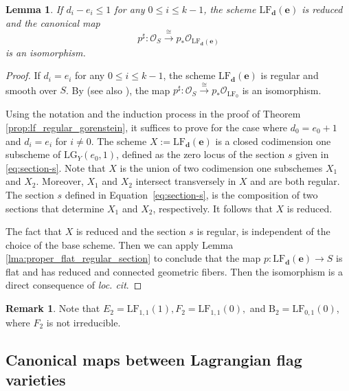 \documentclass[a4paper]{amsart}
\theoremstyle{plain}
\newtheorem{lemma}[theorem]{Lemma}
\theoremstyle{definition}
\newtheorem{remark}[theorem]{Remark}
\numberwithin{equation}{section}
\newcommand{\LG}{\mathrm{LG}}
\newcommand{\Bl}{\mathrm{B}}
\newcommand{\SO}{\mathcal{O}}
\newcommand{\LF}{\mathrm{LF}}
\begin{document}
\begin{lemma}\label{lma:lf_de_structure_sheaf}
    If $d_i -e_{i} \leq 1$ for any $ 0 \leq i \leq k-1$, the scheme $\mathrm{LF}_{\mathbf{d}}(\mathbf{e})$ is reduced and the canonical map
    \[
        p^{\sharp}:\SO_S \xrightarrow{\cong} p_* \SO_{\mathrm{LF}_{\mathbf{d}}(\mathbf{e})}
    \]
    is an isomorphism.
\end{lemma}
\begin{proof}
    If $d_i = e_{i}$ for any $ 0 \leq i \leq k-1$, the scheme $\mathrm{LF}_{\mathbf{d}}(\mathbf{e})$ is regular and smooth over $S$. By \cite[\href{https://stacks.math.columbia.edu/tag/0E0L}{Lemma 0E0L}]{stacks-project} (see also \cite[Exercise 9.3.11, p.260]{FAG}), the map $p^{\sharp}:\SO_S \xrightarrow{\cong} p_* \SO_{\mathrm{LF}_0}$ is an isomorphism.

    Using the notation and the induction process in the proof of Theorem \ref{prop:lf_regular_gorenstein}, it suffices to prove for the case where $d_0 = e_0 + 1$ and $d_i = e_i$ for $i\neq 0$. The scheme $X := \mathrm{LF}_{\mathbf{d}}(\mathbf{e})$ is a closed codimension one subscheme of $\LG_Y(e_0,1)$, defined as the zero locus of the section $s$ given in \eqref{eq:section-s}. Note that $X$ is the union of two codimension one subschemes $X_1$ and $X_2$. Moreover, $X_1$ and $X_2$ intersect transversely in $X$ and are both regular. The section $s$ defined in Equation~\eqref{eq:section-s}, is the composition of two sections that determine $X_1$ and $X_2$, respectively. It follows that $X$ is reduced.

    The fact that $X$ is reduced and the section $s$ is regular, is independent of the choice of the base scheme. Then we can apply Lemma \ref{lma:proper_flat_regular_section} to conclude that the map $p:\mathrm{LF}_{\mathbf{d}}(\mathbf{e}) \to S$ is flat and has reduced and connected geometric fibers. Then the isomorphism is a direct consequence of \textit{loc. cit}.
\end{proof}
\begin{remark}
    Note that
    $E_2 = \mathrm{LF}_{1,1}(1), F_2 = \mathrm{LF}_{1,1}(0), $ and $ \Bl_2 = \mathrm{LF}_{0,1}(0)$, where $F_2$ is not irreducible.
\end{remark}



\subsection{Canonical maps between Lagrangian flag varieties}
\end{document}
